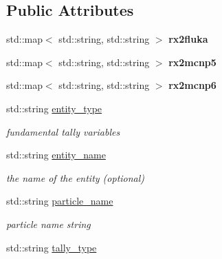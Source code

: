 \subsection*{Public Attributes}
\begin{DoxyCompactItemize}
\item 
\mbox{\label{classpyne_1_1_tally_a451b6a2d7a0de5e54936f2274861cc0d}} 
std\+::map$<$ std\+::string, std\+::string $>$ {\bfseries rx2fluka}
\item 
\mbox{\label{classpyne_1_1_tally_ae402f5aca5baea59ffc51f68e12e0d30}} 
std\+::map$<$ std\+::string, std\+::string $>$ {\bfseries rx2mcnp5}
\item 
\mbox{\label{classpyne_1_1_tally_a6c2c0bad20d29a6b73110ae5610cd572}} 
std\+::map$<$ std\+::string, std\+::string $>$ {\bfseries rx2mcnp6}
\item 
std\+::string \hyperlink{classpyne_1_1_tally_a8b2e517c759ca71bc7b25c4de5a412f9}{entity\+\_\+type}
\begin{DoxyCompactList}\small\item\em fundamental tally variables \end{DoxyCompactList}\item 
\mbox{\label{classpyne_1_1_tally_ac7892546a42be1385f0e805638a124b1}} 
std\+::string \hyperlink{classpyne_1_1_tally_ac7892546a42be1385f0e805638a124b1}{entity\+\_\+name}
\begin{DoxyCompactList}\small\item\em the name of the entity (optional) \end{DoxyCompactList}\item 
\mbox{\label{classpyne_1_1_tally_af79d35607aeb81e366f76ab75e2bfda0}} 
std\+::string \hyperlink{classpyne_1_1_tally_af79d35607aeb81e366f76ab75e2bfda0}{particle\+\_\+name}
\begin{DoxyCompactList}\small\item\em particle name string \end{DoxyCompactList}\item 
\mbox{\label{classpyne_1_1_tally_ae5944106656a49e0f7f525e75acaa4b2}} 
std\+::string \hyperlink{classpyne_1_1_tally_ae5944106656a49e0f7f525e75acaa4b2}{tally\+\_\+type}

\end{DoxyCompactItemize}
